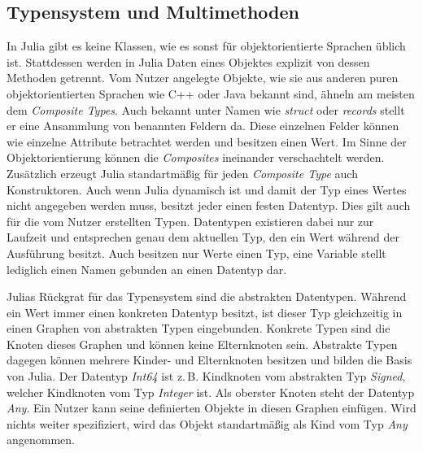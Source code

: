 \documentclass[proseminar,german,utf8]{zihpub}
\newcommand{\zB}[0]{{z.\,B. }}
\begin{document}
\subsection{Typensystem und Multimethoden}

In Julia gibt es keine Klassen, wie es sonst für objektorientierte Sprachen üblich ist. Stattdessen werden in Julia Daten eines Objektes explizit von dessen Methoden getrennt. Vom Nutzer angelegte Objekte, wie sie aus anderen puren objektorientierten Sprachen wie C++ oder Java bekannt sind, ähneln am meisten dem \textit{Composite Types}. Auch bekannt unter Namen wie \textit{struct} oder \textit{records} stellt er eine Ansammlung von benannten Feldern da. Diese einzelnen Felder können wie einzelne Attribute betrachtet werden und besitzen einen Wert. Im Sinne der Objektorientierung können die \textit{Composites} ineinander verschachtelt werden. Zusätzlich erzeugt Julia standartmäßig für jeden \textit{Composite Type} auch Konstruktoren. Auch wenn Julia dynamisch ist und damit der Typ eines Wertes nicht angegeben werden muss, besitzt jeder einen festen Datentyp. Dies gilt auch für die vom Nutzer erstellten Typen.  Datentypen existieren dabei nur zur Laufzeit und entsprechen genau dem aktuellen Typ, den ein Wert während der Ausführung besitzt. Auch besitzen nur Werte einen Typ, eine Variable stellt lediglich einen Namen gebunden an einen Datentyp dar. 

Julias Rückgrat für das Typensystem sind die abstrakten Datentypen. Während ein Wert immer einen konkreten Datentyp besitzt, ist dieser Typ gleichzeitig in einen Graphen von abstrakten Typen eingebunden. Konkrete Typen sind die Knoten dieses Graphen und können keine Elternknoten sein. Abstrakte Typen dagegen können mehrere Kinder- und Elternknoten besitzen und bilden die Basis von Julia. Der Datentyp \textit{Int64} ist \zB Kindknoten vom abstrakten Typ \textit{Signed}, welcher Kindknoten vom Typ \textit{Integer} ist. Als oberster Knoten steht der Datentyp \textit{Any}. Ein Nutzer kann seine definierten Objekte in diesen Graphen einfügen. Wird nichts weiter spezifiziert, wird das Objekt standartmäßig als Kind vom Typ \textit{Any} angenommen. 
\end{document}
